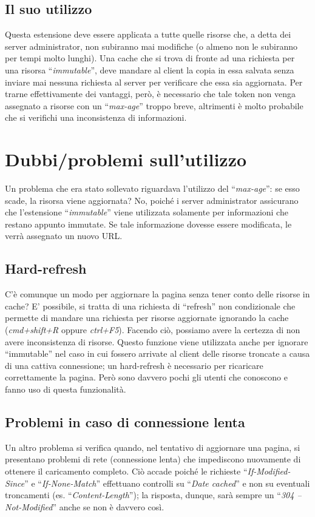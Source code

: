\documentclass[a4paper,12pt]{report}
\begin{document}
\section{Il suo utilizzo}
Questa estensione deve essere applicata a tutte quelle risorse che, a detta dei server administrator, non subiranno mai modifiche (o almeno non le subiranno per tempi molto lunghi).
Una cache che si trova di fronte ad una richiesta per una risorsa “{\itshape immutable}”, deve mandare al client la copia in essa salvata senza inviare mai nessuna richiesta al server per verificare che essa sia aggiornata.
Per trarne effettivamente dei vantaggi, però, è necessario che tale token non venga assegnato a risorse con un “{\itshape max-age}” troppo breve, altrimenti è molto probabile che si verifichi una inconsistenza di informazioni.


\chapter{Dubbi/problemi sull'utilizzo}
Un problema che era stato sollevato riguardava l’utilizzo del “{\itshape max-age}”: se esso scade, la risorsa viene aggiornata? No, poiché i server administrator assicurano che l’estensione “{\itshape immutable}” viene utilizzata solamente per informazioni che restano appunto immutate. Se tale informazione dovesse essere modificata, le verrà assegnato un nuovo URL.

\section{Hard-refresh}
C’è comunque un modo per aggiornare la pagina senza tener conto delle risorse in cache? E’ possibile, si tratta di una richiesta di “refresh” non condizionale che permette di mandare una richiesta per risorse aggiornate ignorando la cache ({\itshape cmd+shift+R} oppure {\itshape ctrl+F5}). Facendo ciò, possiamo avere la certezza di non avere inconsistenza di risorse.
Questo funzione viene utilizzata anche per ignorare “immutable” nel caso in cui fossero arrivate al client delle risorse troncate a causa di una cattiva connessione; un hard-refresh è necessario per ricaricare correttamente la pagina.
Però sono davvero pochi gli utenti che conoscono e fanno uso di questa funzionalità.

\section{Problemi in caso di connessione lenta}
Un altro problema si verifica quando, nel tentativo di aggiornare una pagina, si presentano problemi di rete (connessione lenta) che impediscono nuovamente di ottenere il caricamento completo. Ciò accade poiché le richieste “{\itshape If-Modified-Since}” e “{\itshape If-None-Match}” effettuano controlli su “{\itshape Date cached}” e non su eventuali troncamenti (es. “{\itshape Content-Length}”); la risposta, dunque, sarà sempre un “{\itshape 304 – Not-Modified}” anche se non è davvero così.
\end{document}
